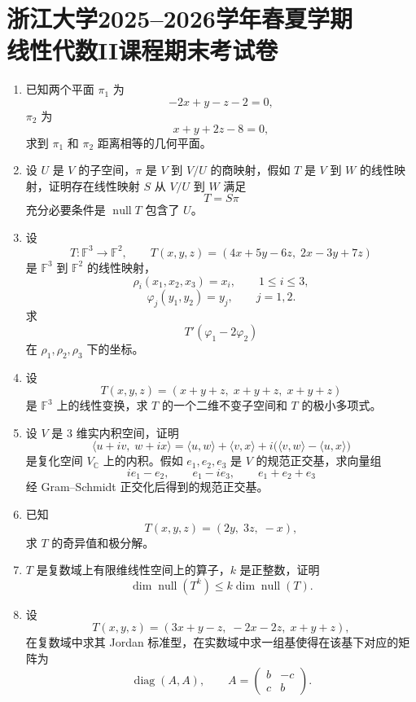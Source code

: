 \documentclass[UTF8]{ctexart}
\begin{document}
\section*{浙江大学2025--2026学年春夏学期\\线性代数II课程期末考试卷}

\begin{enumerate}
\item 已知两个平面 $\pi_1$ 为
\[
-2x+y-z-2=0,
\]
$\pi_2$ 为
\[
x+y+2z-8=0,
\]
求到 $\pi_1$ 和 $\pi_2$ 距离相等的几何平面。

\item 设 $U$ 是 $V$ 的子空间，$\pi$ 是 $V$ 到 $V/U$ 的商映射，假如 $T$ 是 $V$ 到 $W$ 的线性映射，证明存在线性映射 $S$ 从 $V/U$ 到 $W$ 满足
\[
T=S\pi
\]
充分必要条件是 $\operatorname{null}T$ 包含了 $U$。

\item 设
\[
T:\mathbb F^3\to\mathbb F^2,\qquad
T(x,y,z)=(4x+5y-6z,\;2x-3y+7z)
\]
是 $\mathbb F^3$ 到 $\mathbb F^2$ 的线性映射，
\[
\rho_i(x_1,x_2,x_3)=x_i,\qquad 1\leq i\leq 3,
\]
\[
\varphi_j(y_1,y_2)=y_j,\qquad j=1,2.
\]
求
\[
T'(\varphi_1-2\varphi_2)
\]
在 $\rho_1,\rho_2,\rho_3$ 下的坐标。

\item 设
\[
T(x,y,z)=(x+y+z,\;x+y+z,\;x+y+z)
\]
是 $\mathbb F^3$ 上的线性变换，求 $T$ 的一个二维不变子空间和 $T$ 的极小多项式。

\item 设 $V$ 是 $3$ 维实内积空间，证明
\[
\langle u+iv,\;w+ix\rangle
=
\langle u,w\rangle+\langle v,x\rangle
+i\bigl(\langle v,w\rangle-\langle u,x\rangle\bigr)
\]
是复化空间 $V_{\mathbb C}$ 上的内积。假如 $e_1,e_2,e_3$ 是 $V$ 的规范正交基，求向量组
\[
ie_1-e_2,\qquad e_1-ie_3,\qquad e_1+e_2+e_3
\]
经 Gram--Schmidt 正交化后得到的规范正交基。

\item 已知
\[
T(x,y,z)=(2y,\;3z,\;-x),
\]
求 $T$ 的奇异值和极分解。

\item $T$ 是复数域上有限维线性空间上的算子，$k$ 是正整数，证明
\[
\dim\operatorname{null}(T^k)
\leq
k\dim\operatorname{null}(T).
\]

\item 设
\[
T(x,y,z)=(3x+y-z,\;-2x-2z,\;x+y+z),
\]
在复数域中求其 Jordan 标准型，在实数域中求一组基使得在该基下对应的矩阵为
\[
\operatorname{diag}(A,A),
\qquad
A=
\begin{pmatrix}
b&-c\\
c&b
\end{pmatrix}.
\]


\end{enumerate}
\end{document}
